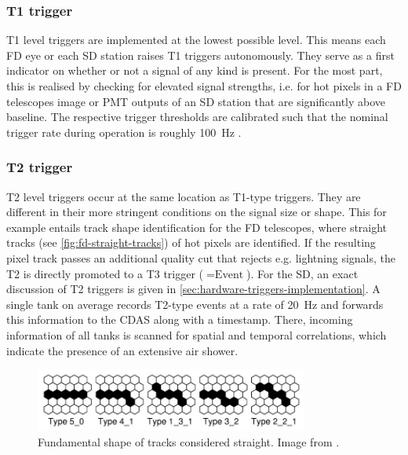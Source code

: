 \subsubsection{T1 trigger}
\label{sssec:t1-trigger}

T1 level triggers are implemented at the lowest possible level. This means each FD eye or each SD station raises T1 triggers autonomously. They serve as a first 
indicator on whether or not a signal of any kind is present. For the most part, this is realised by checking for elevated signal strengths, i.e. for hot pixels 
in a FD telescopes image or PMT outputs of an SD station that are significantly above baseline. The respective trigger thresholds are calibrated such that the 
nominal trigger rate during operation is roughly \SI{100}{\hertz} \cite{FDReconstruction, SDReconstruction}. 

\subsubsection{T2 trigger}
\label{sssec:t2-trigger}

T2 level triggers occur at the same location as T1-type triggers. They are different in their more stringent conditions on the signal size or shape. This for 
example entails track shape identification for the FD telescopes, where straight tracks (see \autoref{fig:fd-straight-tracks}) of hot pixels are identified. 
If the resulting pixel track passes an additional quality cut that rejects e.g. lightning signals, the T2 is directly promoted to a T3 trigger ($=\text{Event}$). 
For the SD, an exact discussion of T2 triggers is given in \autoref{sec:hardware-triggers-implementation}. A single tank on average records T2-type events at a 
rate of \SI{20}{\hertz} and forwards this information to the CDAS along with a timestamp. There, incoming information of all tanks is scanned for spatial and 
temporal correlations, which indicate the presence of an extensive air shower. 

\begin{figure}
	\centering
	\includegraphics[width=0.8\textwidth]{./imgs/FD_straight_tracks.png}
	\caption{Fundamental shape of tracks considered straight. Image from \cite{FDReconstruction}.}
	\label{fig:fd-straight-tracks}
\end{figure}

